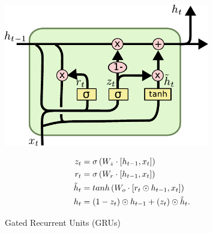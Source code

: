 \begin{figure}[pt]
\begin{minipage}{0.5\textwidth}
    \centering
    \includegraphics[width=0.8\textwidth]{pdf/GRU.pdf}
    \caption{Gated Recurrent Units (GRUs)\label{fig:GRU}}
\end{minipage}
\begin{minipage}{0.5\textwidth}
    \setlength\abovedisplayshortskip{0pt}
    \setlength\belowdisplayshortskip{0pt}
    \strut
    \begin{equation}\label{eq:GRU}
    \begin{split}
        z_t &= \sigma \left( W_z \cdot \left[h_{t-1}, x_t\right]\right) \\
        r_t &= \sigma \left( W_r \cdot \left[h_{t-1}, x_t\right]\right) \\
        \tilde h_t &= tanh \left(W_o \cdot \left[r_t \odot h_{t-1}, x_t\right]\right) \\
        h_t &= (1-z_t) \odot h_{t-1} + (z_t) \odot \tilde h_t.
    \end{split}
    \end{equation}
    \strut
\end{minipage}
\end{figure}
